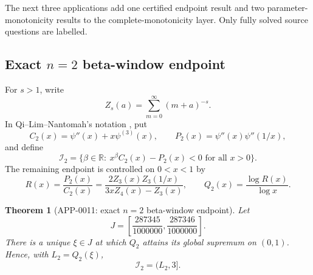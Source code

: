 \documentclass[11pt]{article}
\numberwithin{equation}{section}
\newtheorem{theorem}{Theorem}[section]
\theoremstyle{definition}
\theoremstyle{remark}
\newcommand{\1}{\mathbf 1}
\begin{document}
The next three applications add one certified endpoint result and two parameter-monotonicity results to the complete-monotonicity layer.  Only fully solved source questions are labelled.

\subsection{Exact \(n=2\) beta-window endpoint}

For \(s>1\), write
\begin{equation}
\label{eq:q2-zs-definition}
Z_s(a)=\sum_{m=0}^\infty (m+a)^{-s}.
\end{equation}
In Qi--Lim--Nantomah's notation \cite{qi-lim-nantomah-polygamma}, put
\begin{equation}
\label{eq:q2-cp-definition}
C_2(x)=\psi''(x)+x\psi^{(3)}(x),
\qquad
P_2(x)=\psi''(x)\psi''(1/x),
\end{equation}
and define
\begin{equation}
\label{eq:q2-beta-window}
\mathcal I_2=
\{\beta\in\mathbb R:\ x^\beta C_2(x)-P_2(x)<0\text{ for all }x>0\}.
\end{equation}
The remaining endpoint is controlled on \(0<x<1\) by
\begin{equation}
\label{eq:q2-ratio-q}
R(x)=\frac{P_2(x)}{C_2(x)}
=\frac{2Z_3(x)Z_3(1/x)}{3xZ_4(x)-Z_3(x)},
\qquad
Q_2(x)=\frac{\log R(x)}{\log x}.
\end{equation}

\begin{theorem}[APP-0011: exact \(n=2\) beta-window endpoint]
\label{thm:q2-exact-endpoint}
Let
\begin{equation}
\label{eq:q2-J-bracket}
J=\left[\frac{287345}{1000000},\frac{287346}{1000000}\right].
\end{equation}
There is a unique \(\xi\in J\) at which \(Q_2\) attains its global supremum on \((0,1)\).  Hence, with \(L_2=Q_2(\xi)\),
\begin{equation}
\label{eq:q2-I2-exact}
\mathcal I_2=(L_2,3].
\end{equation}
\end{theorem}
\end{document}
